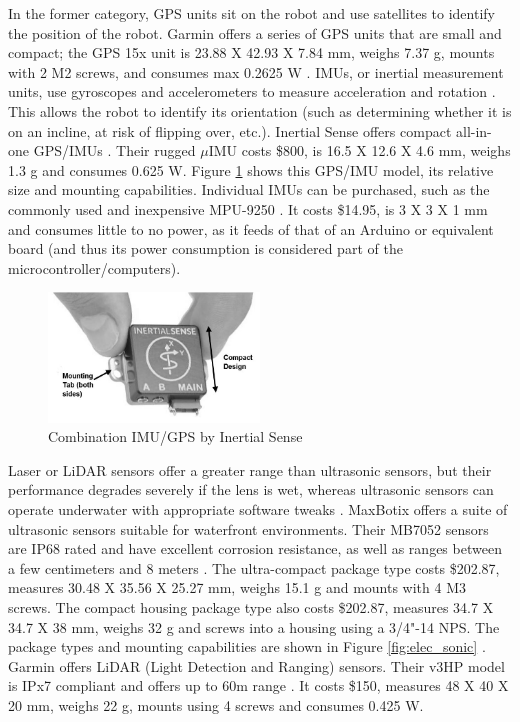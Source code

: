 In the former category, GPS units sit on the robot and use satellites to identify the position of the robot.
Garmin offers a series of GPS units that are small and compact; the GPS 15x unit is 23.88 X 42.93 X 7.84 mm, weighs 7.37 g, mounts with 2 M2 screws, and consumes max 0.2625 W \cite{garmin_gps_2011}.
IMUs, or inertial measurement units, use gyroscopes and accelerometers to measure acceleration and rotation \cite{unmannedsystemstechnology_selecting_2018}.
This allows the robot to identify its orientation (such as determining whether it is on an incline, at risk of flipping over, etc.).
Inertial Sense offers compact all-in-one GPS/IMUs \cite{inertial_sense_imu_nodate}.
Their rugged $\mu$IMU costs \$800, is 16.5 X 12.6 X 4.6 mm, weighs 1.3 g and consumes 0.625 W. Figure \ref{fig:elec_IMUGPS} shows this GPS/IMU model, its relative size and mounting capabilities.
Individual IMUs can be purchased, such as the commonly used and inexpensive MPU-9250 \cite{sparkfun_sparkfun_nodate}.
It costs \$14.95, is 3 X 3 X 1 mm and consumes little to no power, as it feeds of that of an Arduino or equivalent board (and thus its power consumption is considered part of the microcontroller/computers).

\begin{figure}[H]
    \centering
    \includegraphics[width=0.5\textwidth]{Sections/LiteratureReview/img/electronics/elec_IMUGPS.JPG}
    \caption{Combination IMU/GPS by Inertial Sense \cite{inertial_sense_imu_nodate} }
    \label{fig:elec_IMUGPS}
\end{figure}

Laser or LiDAR sensors offer a greater range than ultrasonic sensors, but their performance degrades severely if the lens is wet, whereas ultrasonic sensors can operate underwater with appropriate software tweaks \cite{corrigan_obstacle_2019} \cite{garmin_lidar-lite_nodate}.
MaxBotix offers a suite of ultrasonic sensors suitable for waterfront environments.
Their MB7052 sensors are IP68 rated and have excellent corrosion resistance, as well as ranges between a few centimeters and 8 meters \cite{maxbotix_mb7052_nodate}.
The ultra-compact package type costs \$202.87, measures 30.48 X 35.56 X 25.27 mm, weighs 15.1 g and mounts with 4 M3 screws.
The compact housing package type also costs \$202.87, measures 34.7 X 34.7 X 38 mm, weighs 32 g and screws into a housing using a 3/4"-14 NPS. The package types and mounting capabilities are shown in Figure \ref{fig:elec_sonic} .
Garmin offers LiDAR (Light Detection and Ranging) sensors.
Their v3HP model is IPx7 compliant and offers up to 60m range \cite{garmin_lidar-lite_nodate}.
It costs \$150, measures 48 X 40 X 20 mm, weighs 22 g, mounts using 4 screws and consumes 0.425 W.

